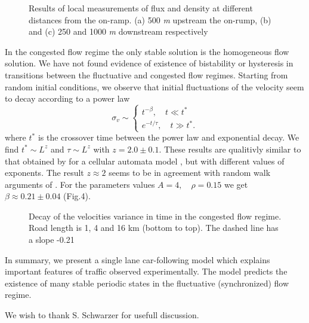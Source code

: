 \begin{figure*}
\label{3}

\centerline{  }
\vskip0.2cm
\caption{Results of local measurements of flux and density at different distances from the on-ramp. (a) 500 {\it m} upstream the on-rump, (b) and (c) 250 and 1000 {\it m} downstream respectively}

\end{figure*}

In the congested flow regime the only stable solution is the homogeneous flow
solution. We have not found evidence of existence of bistability or hysteresis
in transitions between the fluctuative and congested flow regimes. Starting
from random initial conditions, we observe that initial fluctuations of the
velocity seem to decay according to a power law
\begin{equation}
\sigma_v\sim\left\{ 
\begin{array}{l} 
t^{-\beta},\quad t\ll t^* \\ 
e^{-t/\tau},\quad t\gg t^*. 
\end{array} 
\right.
\end{equation}
where $t^*$ is the crossover time between the power law and exponential decay.
We find $t^* \sim L^z$ and $\tau \sim L^z$ with $z=2.0\pm 0.1$. These results
are qualitivly similar to that obtained by \cite{Kertesz} for a cellular
automata model \cite{NS}, but with different values of exponents. The result
$z \approx 2$ seems to be in agreement with random walk arguments of \cite{PN}.
For the parameters values $A=4, \quad \rho=0.15$ we get $\beta \approx 0.21\pm
0.04$ (Fig.4).

\begin{figure*}
\label{4}

\centerline{  }
\caption{Decay of the velocities variance in time in the congested flow regime. Road length is 1, 4 and 16 km (bottom to top). The dashed line has a slope -0.21}
\end{figure*}

In summary, we present a single lane car-following model which explains
important features of traffic observed experimentally. The model predicts the
existence of many stable periodic states in the fluctuative (synchronized)
flow regime.

We wish to thank S. Schwarzer for usefull discussion.

